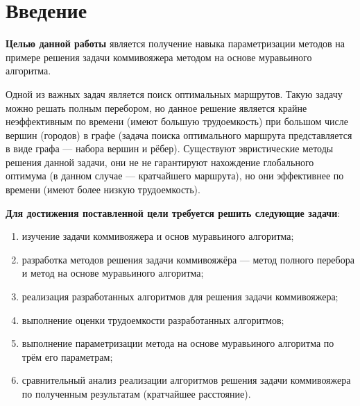 \chapter*{Введение}
\textbf{Целью данной работы} является получение навыка параметризации методов на примере решения задачи коммивояжера методом на основе муравьиного алгоритма.

Одной из важных задач является поиск оптимальных маршрутов. Такую задачу можно решать полным перебором, но данное решение является крайне неэффективным по времени (имеют большую трудоемкость) при большом числе вершин (городов) в графе (задача поиска оптимального маршрута представляется в виде графа --- набора вершин и рёбер). Существуют эвристические методы решения данной задачи, они не не гарантируют нахождение глобального оптимума (в данном случае --- кратчайшего маршрута), но они эффективнее по времени (имеют более низкую трудоемкость). 

\textbf{Для достижения поставленной цели требуется решить следующие задачи}:
\begin{enumerate}[label={\arabic*)}]
        \item изучение задачи коммивояжера и основ муравьиного алгоритма;
	\item разработка методов решения задачи коммивояжёра --- метод полного перебора и метод на основе муравьиного алгоритма;
        \item реализация разработанных алгоритмов для решения задачи коммивояжера;
	\item выполнение оценки трудоемкости разработанных алгоритмов;
        \item выполнение параметризации метода на основе муравьиного алгоритма по трём его параметрам;
        \item сравнительный анализ реализации алгоритмов решения задачи коммивояжера по полученным результатам (кратчайшее расстояние).
\end{enumerate}